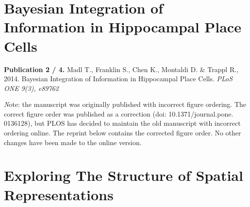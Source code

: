 \documentclass[12pt,PhD,twoside]{muthesis}
\begin{document}
\addtocounter{page}{-25}

\chapter{Bayesian Integration of Information in Hippocampal Place Cells}
\label{cha:bayespc}

\textbf{Publication 2 / 4.} Madl T., Franklin S., Chen K., Montaldi D. \& Trappl R., 2014. Bayesian Integration of Information in Hippocampal Place Cells. \textit{PLoS ONE 9(3), e89762}

\vspace{1cm}
 
\textit Note: the manuscript was originally published with incorrect figure ordering. The correct figure order was published as a correction (doi: 10.1371/journal.pone. 0136128), but PLOS has decided to maintain the old manuscript with incorrect ordering online. The reprint below contains the corrected figure order. No other changes have been made to the online version.

\newpage

\addtocounter{page}{-1}



\addtocounter{page}{-15}

\chapter{Exploring The Structure of Spatial Representations}
\label{cha:structure}
\end{document}
